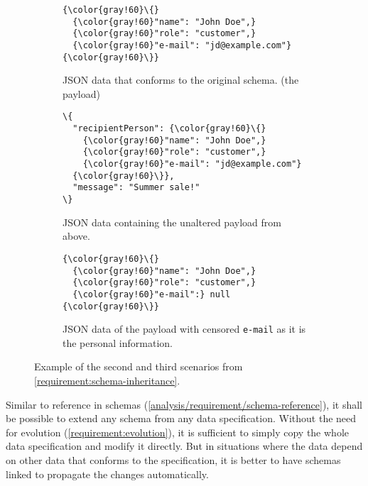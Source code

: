 \begin{figure}[h!]\centering
  \begin{subfigure}{\textwidth}
  \begin{Verbatim}[commandchars=\\\{\}]
{\color{gray!60}\{}
  {\color{gray!60}"name": "John Doe",}
  {\color{gray!60}"role": "customer",}
  {\color{gray!60}"e-mail": "jd@example.com"}
{\color{gray!60}\}}
    \end{Verbatim}
    \caption{JSON data that conforms to the original schema. (the payload)}
  \end{subfigure}


  \begin{subfigure}[b]{.45\textwidth}

    \begin{Verbatim}[commandchars=\\\{\}]
\{
  "recipientPerson": {\color{gray!60}\{}
    {\color{gray!60}"name": "John Doe",}
    {\color{gray!60}"role": "customer",}
    {\color{gray!60}"e-mail": "jd@example.com"}
  {\color{gray!60}\}},
  "message": "Summer sale!"
\}
    \end{Verbatim}
    \caption{JSON data containing the unaltered payload from above.}
    \label{fig:schema-inheritance:json-data-unaltered}
  \end{subfigure}\hfill%
  \begin{subfigure}[b]{.45\textwidth}
    \begin{Verbatim}[commandchars=\\\{\}]
{\color{gray!60}\{}
  {\color{gray!60}"name": "John Doe",}
  {\color{gray!60}"role": "customer",}
  {\color{gray!60}"e-mail":} null
{\color{gray!60}\}}
    \end{Verbatim}
    \caption{JSON data of the payload with censored {\tt e-mail} as it is the personal information.}
    \label{fig:schema-inheritance:json-data-censored}
    \end{subfigure}%
  \caption{Example of the second and third scenarios from \autoref{requirement:schema-inheritance}.}
\end{figure}

Similar to reference in schemas (\autoref{analysis/requirement/schema-reference}), it shall be possible to extend any schema from any data specification. Without the need for evolution (\autoref{requirement:evolution}), it is sufficient to simply copy the whole data specification and modify it directly. But in situations where the data depend on other data that conforms to the specification, it is better to have schemas linked to propagate the changes automatically.

